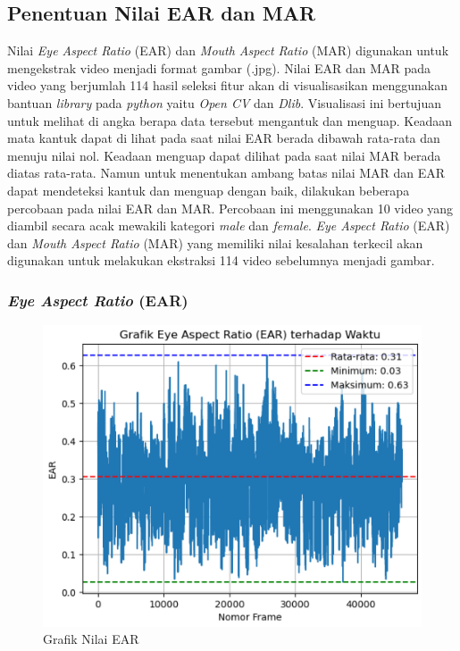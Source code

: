 \subsection{Penentuan Nilai EAR dan MAR}

    
    Nilai \textit{Eye Aspect Ratio} (EAR) dan 
    \textit{Mouth Aspect Ratio} (MAR) digunakan untuk 
    mengekstrak video menjadi format gambar (.jpg). 
    Nilai EAR dan MAR pada video yang berjumlah 114 hasil seleksi 
    fitur akan di visualisasikan menggunakan bantuan \textit{library} pada \textit{python} yaitu \textit{Open CV} dan \textit{Dlib}. Visualisasi ini bertujuan untuk melihat di angka berapa data tersebut mengantuk dan menguap. Keadaan mata kantuk dapat di lihat pada saat nilai EAR berada dibawah rata-rata dan menuju nilai nol. Keadaan menguap dapat dilihat pada saat nilai MAR berada diatas rata-rata. Namun untuk menentukan ambang batas nilai MAR dan EAR dapat mendeteksi kantuk dan menguap dengan baik, dilakukan beberapa  percobaan pada nilai EAR dan MAR. Percobaan ini menggunakan 10 video yang diambil secara acak mewakili kategori \textit{male} dan \textit{female}.
    \textit{Eye Aspect Ratio} (EAR) dan \textit{Mouth Aspect Ratio} 
    (MAR) yang memiliki nilai kesalahan terkecil akan digunakan 
    untuk melakukan ekstraksi 114 video sebelumnya menjadi gambar.

\subsubsection{\textit{Eye Aspect Ratio} (EAR)}

        
         \begin{figure}[H]
             \centering
             \includegraphics[width=0.75\linewidth]{figures/bab4/nilai ear.png}
             \caption{Grafik Nilai EAR}
             \label{Grafik Nilai EAR}
         \end{figure}

